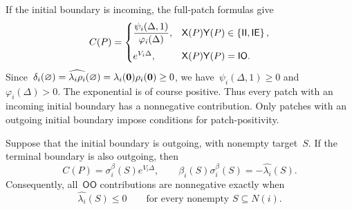 If the initial boundary is incoming, the full-patch formulas give
\begin{equation*}
C(P)
=
\begin{cases}
\displaystyle
\frac{\psi_i(\Delta,1)}{\varphi_i(\Delta)},
&\mathsf X(P)\mathsf Y(P)\in\left\{\mathsf{II},\mathsf{IE}\right\},
\\[1em]
e^{V_i\Delta},
&\mathsf X(P)\mathsf Y(P)=\mathsf{IO}.
\end{cases}
\end{equation*}
Since~$\delta_i(\varnothing)
=\widehat{\lambda_i\rho_i}(\varnothing)
=\lambda_i(\mathbf{0})\rho_i(\mathbf{0})\geq0$,
we have~$\psi_i(\Delta,1)\geq0$ and~$\varphi_i(\Delta)>0$. The exponential is of course positive. Thus every patch with an
incoming initial boundary has a nonnegative contribution. Only patches with an
outgoing initial boundary impose conditions for patch-positivity.

Suppose that the initial boundary is outgoing, with nonempty target~$S$. If the
terminal boundary is also outgoing, then
\begin{equation*}
C(P)=\sigma_i^\beta(S)e^{V_i\Delta},
\qquad
\beta_i(S)\sigma_i^\beta(S)=-\widehat{\lambda_i}(S).
\end{equation*}
Consequently, all~$\mathsf{OO}$ contributions are nonnegative exactly when
\begin{equation}
\label{eq:patch-positivity-first-inequality}
\widehat{\lambda_i}(S)\leq0
\qquad\text{for every nonempty }S\subseteq N(i).
\end{equation}

